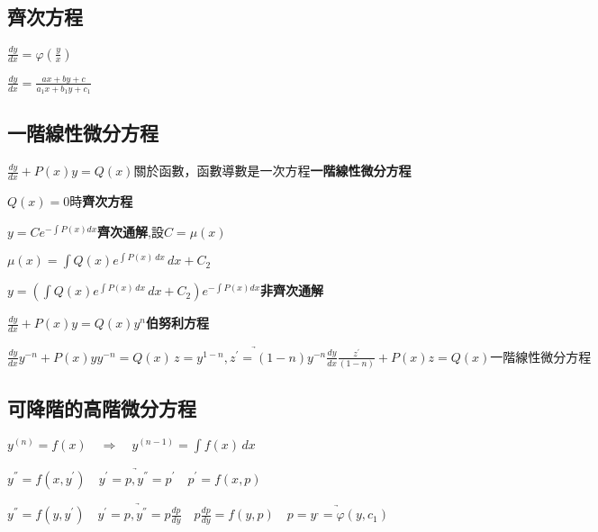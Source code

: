 \documentclass[UTF8]{ctexart}
\begin{document}
\subsection{齊次方程}
$\frac{dy}{dx}=\varphi\left(\frac{y}{x} \right) $\par
$\frac{dy}{dx}=\frac{ax+by+c}{a_1x+b_1y+c_1}$

\subsection{一階線性微分方程}
$\frac{dy}{dx}+P\left(x \right)y=Q\left(x \right)$關於函數，函數導數是一次方程\textbf{一階線性微分方程}\par
$Q\left(x \right)=0$時\textbf{齊次方程}\par
$y=Ce^{-\int P\left(x \right)dx }$\textbf{齊次通解},設$C=\mu \left(x\right)$\par
$\mu \left(x\right)=\int Q\left(x\right)e^{\int P\left(x \right)\,dx }\,dx+C_2 $\par
$y=\left(\int Q\left(x\right)e^{\int P\left(x \right)\,dx }\,dx+C_2\right)e^{-\int P\left(x \right)dx } $\textbf{非齊次通解}\par
$\frac{dy}{dx}+P\left(x\right)y=Q\left(x\right)y^n$\textbf{伯努利方程}\par
$\frac{dy}{dx}y^{-n}+P\left(x\right)yy^{-n}=Q\left(x\right)\,
\underrightarrow{z=y^{1-n},z^{'}=\left(1-n\right)y^{-n}\frac{dy}{dx}}
\frac{z^{'}}{\left(1-n\right)}+P\left(x\right)z=Q\left(x\right)
\textbf{一階線性微分方程}
$
\subsection{可降階的高階微分方程}
$y^{\left(n\right)}=f\left(x\right) \quad
\Rightarrow \quad
y^{\left(n-1\right)}=\int f\left(x\right)\,dx 
$\par

$y^{''}=f\left(x,y^{'}\right)\quad
\underrightarrow{y^{'}=p , y^{''}=p^{'}}\quad
p^{'}=f\left(x,p\right) 
$\par

$y^{''}=f\left(y,y^{'}\right)\quad
\underrightarrow{y^{'}=p , y^{''}=p\frac{dp}{dy}}\quad
p\frac{dp}{dy}=f\left(y,p\right) \quad
\underrightarrow{p=y^{,}=\varphi\left(y,c_1\right)}\quad
$
\end{document}
